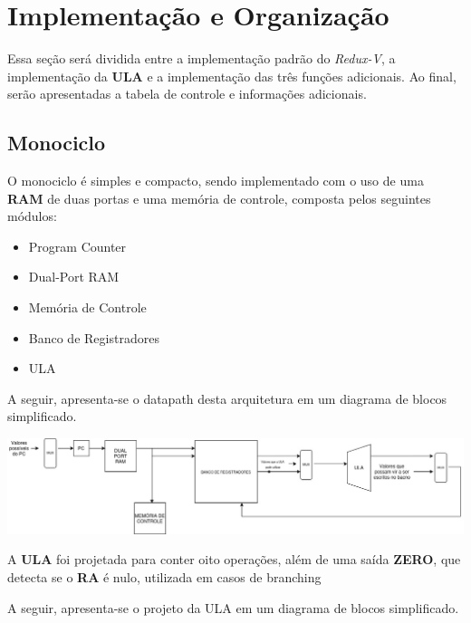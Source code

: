 \documentclass{article}  %
\begin{document}
    \clearpage
    \section{Implementação e Organização}

    Essa seção será dividida entre a implementação padrão do \textit{Redux-V}, a implementação da \textbf{ULA} e a implementação das três funções adicionais. Ao final, serão apresentadas a tabela de controle e informações adicionais.

    \subsection{Monociclo}

    O monociclo é simples e compacto, sendo implementado com o uso de uma \textbf{RAM} de duas portas e uma memória de controle, composta pelos seguintes módulos:

    \begin{itemize}
      \item Program Counter
      \item Dual-Port RAM
      \item Memória de Controle
      \item Banco de Registradores
      \item ULA
    \end{itemize}

    A seguir, apresenta-se o datapath desta arquitetura em um diagrama de blocos simplificado.

    \vspace{1cm}
    \noindent\hspace*{-4cm}\includegraphics[scale=0.5]{datapath.jpg}
    \vspace{1cm}

    A \textbf{ULA} foi projetada para conter oito operações, além de uma saída \textbf{ZERO}, que detecta se o \textbf{RA} é nulo, utilizada em casos de branching

    A seguir, apresenta-se o projeto da ULA em um diagrama de blocos simplificado.
    
\end{document}
